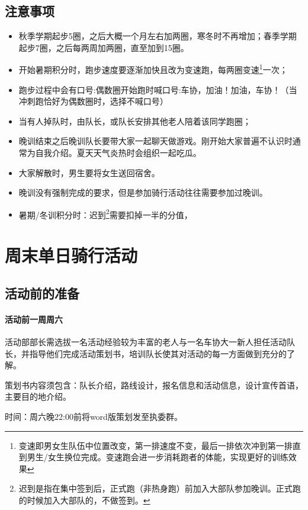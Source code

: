 \documentclass{ctexbook}
\begin{document}
\subsection{注意事项}
\begin{itemize}
    \item 秋季学期起步5圈，之后大概一个月左右加两圈，寒冬时不再增加；春季学期起步7圈，之后每两周加两圈，直至加到15圈。
    \item 开始暑期积分时，跑步速度要逐渐加快且改为变速跑，每两圈变速\footnote{变速即男女生队伍中位置改变，第一排速度不变，最后一排依次冲到第一排直到男生/女生换位完成。变速跑会进一步消耗跑者的体能，实现更好的训练效果}一次；
    \item 跑步过程中会有口号:偶数圈开始跑时喊口号:车协，加油！加油，车协！（当冲刺跑恰好为偶数圈时，选择不喊口号）
    \item 当有人掉队时，由队长，或队长安排其他老人陪着该同学跑圈；
    \item 晚训结束之后晚训队长要带大家一起聊天做游戏。刚开始大家普遍不认识时通常为自我介绍。夏天天气炎热时会组织一起吃瓜。  
    \item 大家解散时，男生要将女生送回宿舍。
    \item 晚训没有强制完成的要求，但是参加骑行活动往往需要参加过晚训。
    \item 暑期/冬训积分时：迟到\footnote{迟到是指在集中签到后，正式跑（非热身跑）前加入大部队参加晚训。正式跑的时候加入大部队的，不做签到。}需要扣掉一半的分值，
\end{itemize}

\section{周末单日骑行活动}

\subsection{活动前的准备}

\paragraph{活动前一周周六}

活动部部长需选拔一名活动经验较为丰富的老人与一名车协大一新人担任活动队长，并指导他们完成活动策划书，培训队长使其对活动的每一方面做到充分的了解。

策划书内容须包含：队长介绍，路线设计，报名信息和活动信息，设计宣传首语，主要目的地介绍。

时间：周六晚22:00前将word版策划发至执委群。
\end{document}
